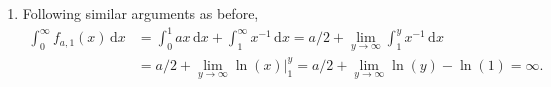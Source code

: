 \documentclass[11pt]{exam}
\begin{document}
\begin{questions}
\begin{solution}[0cm]
\begin{enumerate}[leftmargin = 0.5cm, label = (\alph*), rightmargin = 0.2cm]
        \item Following similar arguments as before,
        \begin{align*}
            \int_0^\infty f_{a, 1}(x)\,\mathrm{d}x &= \int_0^1 ax\,\mathrm{d}x + \int_1^\infty x^{-1}\,\mathrm{d}x  
            = a/2 + \lim_{y\rightarrow\infty} \int_1^y x^{-1}\, \mathrm{d} x \\
            &= a/2 + \lim_{y\rightarrow\infty} \ln(x)\big|_1^y = a/2 + \lim_{y\rightarrow\infty} \ln(y) - \ln(1) = \infty.
        \end{align*}

    \end{enumerate}
\end{solution}

\end{questions}	
\end{document}
